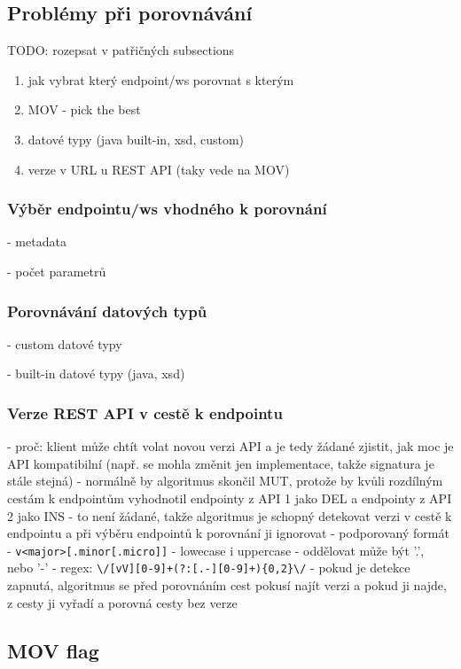 \documentclass[czech,DP]{thesiskiv}
\begin{document}
\subsection{Problémy při porovnávání}	

TODO: rozepsat v patřičných subsections
\begin{enumerate}
	\item jak vybrat který endpoint/ws porovnat s kterým
	\item MOV - pick the best
	\item datové typy (java built-in, xsd, custom)
	\item verze v URL u REST API (taky vede na MOV)
\end{enumerate}
	
\subsubsection{Výběr endpointu/ws vhodného k porovnání}
 - metadata
 
 - počet parametrů
 
\subsubsection{Porovnávání datových typů}
 - custom datové typy
 
 - built-in datové typy (java, xsd)

	
\subsubsection{Verze REST API v cestě k endpointu}	

- proč: klient může chtít volat novou verzi API a je tedy žádané zjistit, jak moc je API kompatibilní (např. se mohla změnit jen implementace, takže signatura je stále stejná)
- normálně by algoritmus skončil MUT, protože by kvůli rozdílným cestám k endpointům vyhodnotil endpointy z API 1 jako DEL a endpointy z API 2 jako INS
- to není žádané, takže algoritmus je schopný detekovat verzi v cestě k endpointu a při výběru endpointů k porovnání ji ignorovat
- podporovaný formát
	- \verb|v<major>[.minor[.micro]]|
	- lowecase i uppercase
	- oddělovat může být '.', nebo '-'
	- regex: \verb|\/[vV][0-9]+(?:[.-][0-9]+){0,2}\/|
- pokud je detekce zapnutá, algoritmus se před porovnáním cest pokusí najít verzi a pokud ji najde, z cesty ji vyřadí a porovná cesty bez verze
	
\subsection{MOV flag}	
\end{document}
